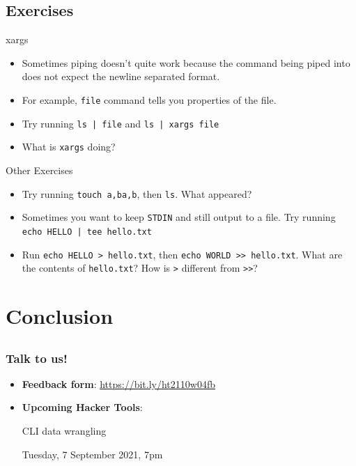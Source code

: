 \documentclass[12pt]{beamer}
\begin{document}
\subsection{Exercises}
\begin{frame}{xargs}
  \begin{itemize}
    \item Sometimes piping doesn't quite work because the command being piped into does not expect the newline separated format.
    \item For example, \texttt{file} command tells you properties of the file.
    \item Try running \texttt{ls | file} and \texttt{ls | xargs file}
    \item What is \texttt{xargs} doing?
  \end{itemize}
\end{frame}

\begin{frame}{Other Exercises}
  \begin{itemize}
    \item Try running \texttt{touch {a,b}{a,b}}, then \texttt{ls}. What appeared?
    \item Sometimes you want to keep \texttt{STDIN} and still output to a file. Try running \texttt{echo HELLO | tee hello.txt}
    \item Run \texttt{echo HELLO > hello.txt}, then \texttt{echo WORLD >> hello.txt}. What are the contents of \texttt{hello.txt}? How is \texttt{>} different from \texttt{>>}?
  \end{itemize}
\end{frame}

\section{Conclusion}
\subsection{}
\begin{frame}
  \frametitle{Talk to us!}
  \begin{itemize}
    \item \textbf{Feedback form}: \url{https://bit.ly/ht2110w04fb}
    \item \textbf{Upcoming Hacker Tools}:

          CLI data wrangling
          
          Tuesday, 7 September 2021, 7pm
  \end{itemize}
\end{frame}
\end{document}
